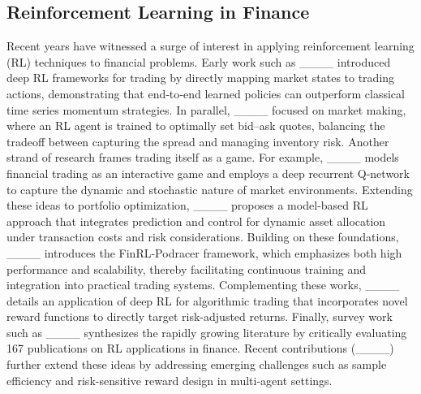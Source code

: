 \subsection{Reinforcement Learning in Finance}
Recent years have witnessed a surge of interest in applying reinforcement learning (RL) techniques to financial problems. Early work such as ____ introduced deep RL frameworks for trading by directly mapping market states to trading actions, demonstrating that end‐to‐end learned policies can outperform classical time series momentum strategies. In parallel, ____ focused on market making, where an RL agent is trained to optimally set bid–ask quotes, balancing the tradeoff between capturing the spread and managing inventory risk. Another strand of research frames trading itself as a game. For example, ____ models financial trading as an interactive game and employs a deep recurrent Q-network to capture the dynamic and stochastic nature of market environments. Extending these ideas to portfolio optimization, ____ proposes a model‐based RL approach that integrates prediction and control for dynamic asset allocation under transaction costs and risk considerations. Building on these foundations, ____ introduces the FinRL-Podracer framework, which emphasizes both high performance and scalability, thereby facilitating continuous training and integration into practical trading systems. Complementing these works, ____ details an application of deep RL for algorithmic trading that incorporates novel reward functions to directly target risk-adjusted returns. Finally, survey work such as ____ synthesizes the rapidly growing literature by critically evaluating 167 publications on RL applications in finance. Recent contributions (____) further extend these ideas by addressing emerging challenges such as sample efficiency and risk-sensitive reward design in multi-agent settings. 

